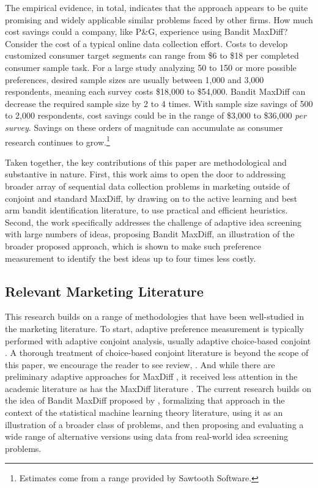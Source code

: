 \documentclass[nonblindrev]{informs3}
\begin{document}
The empirical evidence, in total, indicates that the approach appears to be quite promising and widely applicable similar problems faced by other firms. How much cost savings could a company, like P\&G, experience using Bandit MaxDiff? Consider the cost of a typical online data collection effort. Costs to develop customized consumer target segments can range from \$6 to \$18 per completed consumer sample task. For a large study analyzing 50 to 150 or more possible preferences, desired sample sizes are usually between 1,000 and 3,000 respondents, meaning each survey costs \$18,000 to \$54,000. Bandit MaxDiff can decrease the required sample size by 2 to 4 times. With sample size savings of 500 to 2,000 respondents, cost savings could be in the range of \$3,000 to \$36,000 \emph{per survey}. Savings on these orders of magnitude can accumulate as consumer research continues to grow.\footnote{Estimates come from a range provided by Sawtooth Software.}

Taken together, the key contributions of this paper are methodological and substantive in nature. First, this work aims to open the door to addressing broader array of sequential data collection problems in marketing outside of conjoint and standard MaxDiff, by drawing on to the active learning and best arm bandit identification literature, to use practical and efficient heuristics. Second, the work specifically addresses the challenge of adaptive idea screening with large numbers of ideas, proposing Bandit MaxDiff, an illustration of the broader proposed approach, which is shown to make such preference measurement to identify the best ideas up to four times less costly.


\subsection{Relevant Marketing Literature}

This research builds on a range of methodologies that have been well-studied in the marketing literature. To start, adaptive preference measurement is typically performed with adaptive conjoint analysis, usually adaptive choice-based conjoint \citep{arora2001improving,toubia2003fast,toubia2004polyhedral}. A thorough treatment of choice-based conjoint literature is beyond the scope of this paper, we encourage the reader to see review, \cite{toubia2007chapter}. And while there are preliminary adaptive approaches for MaxDiff \citep{orme2006adaptive}, it received less attention in the academic literature as has the MaxDiff literature \citep{cohen2003maximum}. The current research builds on the idea of Bandit MaxDiff proposed by \cite{fairchildetal2015banditmaxdiff}, formalizing that approach in the context of the statistical machine learning theory literature, using it as an illustration of a broader class of problems, and then proposing and evaluating a wide range of alternative versions using data from real-world idea screening problems.
\end{document}
